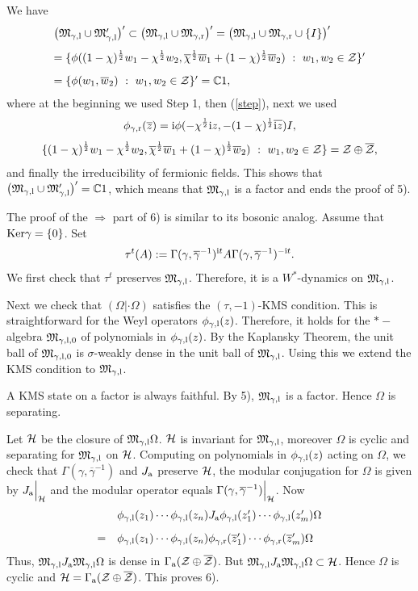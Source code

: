 \documentclass{svmult}
\def\cc{{\mathbb C}}
\def\bar{\overline}
\def\l{{\rm l}}
\def\r{{\rm r}}
\def\cZ{{\cal Z}}
\def\fM{{\mathfrak M}}
\def\a{{\rm a}}
\def\i{{\rm i}}
\def\Ker{{\rm Ker}}
\def\one{{\bf 1}}
\def\cH{{\cal H}}
\def\l{{\rm l}}
\def\r{{\rm r}}
\def\Ker{{\rm Ker}}
\def\one{{ 1}}
\def\cH{{\cal H}}
\begin{document}
We have
\[\begin{array}{l}
\bigl(\fM_{\gamma,\l}\cup\fM_{\gamma,\l}'\bigr)'
\subset
\bigl(\fM_{\gamma,\l}\cup\fM_{\gamma,\r}\bigr)'
=\bigl(\fM_{\gamma,\l}\cup\fM_{\gamma,\r}\cup\{I\}\bigr)'\\[3mm]
=\{\phi((1-\chi)^{\frac12} w_1-\chi^{\frac12}w_2,
\bar\chi^{\frac12}\bar w_1+(1-\chi)^{\frac12}\bar w_2)\ 
:\ w_1,w_2\in\cZ\}'
\\[3mm]
=\{\phi(w_1,\bar w_2)\ :\ w_1,w_2\in\cZ\}'=\cc\one,\end{array}\]
where at the beginning we used Step 1,  then
 (\ref{step}), next we used
\[
\phi_{\gamma,\r}(\bar z)=\i \phi(-\chi^{\frac12} \i z,-(1-\chi)^{\frac12}
\bar{\i z})I,\]
\[
\{(1-\chi)^{\frac12} w_1-\chi^{\frac12}w_2,
\bar\chi^{\frac12}\bar w_1+(1-\chi)^{\frac12}\bar w_2)\ 
:\ w_1,w_2\in\cZ\}=\cZ\oplus\bar\cZ,\]
and finally the irreducibility of fermionic fields.
This shows that 
$\bigl(\fM_{\gamma,\l}\cup\fM_{\gamma,\l}'\bigr)'=\cc\one$, which means
 that
 $\fM_{\gamma,\l}$ is a factor and ends the proof of 5).


The proof of the $\Rightarrow$ part of
 6) is similar to its bosonic analog. Assume that $\Ker\gamma=\{0\}$. 
Set \[\tau^t(A):=\Gamma(\gamma,\bar\gamma^{-1})^{\i t}A
\Gamma(\gamma,\bar\gamma^{-1})^{-\i t}.\] We first
check that $\tau^t$ preserves $\fM_{\gamma,\l}$. Therefore, it is a
$W^*$-dynamics on $\fM_{\gamma,\l}$. 

Next we check that  $(\Omega|\cdot\Omega)$ satisfies
  the $(\tau, -1)$-KMS condition.
 This is
straightforward for the Weyl operators $\phi_{\gamma,\l}(z)$.
 Therefore, it holds for
the $*-$algebra $\fM_{\gamma,\l,0}$  of polynomials
in 
 $\phi_{\gamma,\l}(z)$. By the Kaplansky Theorem,
 the unit ball of 
 $\fM_{\gamma,\l,0}$ is $\sigma$-weakly dense in the unit ball of
 $\fM_{\gamma,\l}$. Using this we extend the KMS condition to
 $\fM_{\gamma,\l}$.


A KMS state on a factor is always faithful. By 5),  $\fM_{\gamma,\l}$ is a
factor. Hence
$\Omega$ is separating.

Let $\cH$ be the closure of $\fM_{\gamma,\l}\Omega$. $\cH$ is invariant for
$\fM_{\gamma,\l}$, moreover $\Omega$ is cyclic and separating 
 for $\fM_{\gamma,\l}$ on $\cH$. 
Computing on  polynomials in
 $\phi_{\gamma,\l}(z)$ acting on $\Omega$,  we
check that  $\Gamma(\gamma,\bar\gamma^{-1})$ and $J_\a$ preserve $\cH$,
the modular
conjugation for $\Omega$
is given by $J_\a\Big|_\cH $
 and  the modular operator equals
 $\Gamma(\gamma,\bar\gamma^{-1})\Big|_\cH$. 
Now\[\begin{array}{rl}&
\phi_{\gamma,\l}(z_1)\cdots \phi_{\gamma,\l}(z_n)J_\a
\phi_{\gamma,\l}(z_1')\cdots \phi_{\gamma,\l}(z_m')
 \Omega\\[3mm]=&
\phi_{\gamma,\l}(z_1)\cdots \phi_{\gamma,\l}( z_n)
\phi_{\gamma,\r}(\bar z_1')\cdots \phi_{\gamma,\r}(\bar z_m')
 \Omega
\end{array}\]
Thus,
 $\fM_{\gamma,\l}J_\a\fM_{\gamma,\l}\Omega$ is dense 
in $\Gamma_\a(\cZ\oplus\bar\cZ)$. But
 $\fM_{\gamma,\l}J_\a\fM_{\gamma,\l}\Omega\subset\cH$. 
Hence $\Omega$ is cyclic and
$\cH=\Gamma_\a(\cZ\oplus\bar\cZ)$.
This proves 6).
\end{document}
